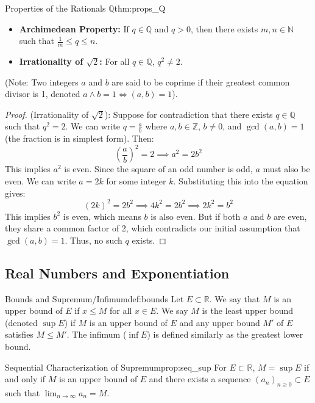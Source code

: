 \documentclass[11pt, a4paper]{article}
\begin{document}
\begin{theorem}{Properties of the Rationals $\mathbb{Q}$}{thm:props_Q}
\begin{itemize}
    \item \textbf{Archimedean Property:} If $q \in \mathbb{Q}$ and $q > 0$, then there exists $m, n \in \mathbb{N}$ such that $\frac{1}{m} \le q \le n$.
    \item \textbf{Irrationality of $\sqrt{2}$:} For all $q \in \mathbb{Q}$, $q^2 \neq 2$.
\end{itemize}
(Note: Two integers $a$ and $b$ are said to be coprime if their greatest common divisor is 1, denoted $a \wedge b = 1 \iff (a,b)=1$).
\end{theorem}
\begin{proof}
(Irrationality of $\sqrt{2}$): Suppose for contradiction that there exists $q \in \mathbb{Q}$ such that $q^2 = 2$.
We can write $q = \frac{a}{b}$ where $a, b \in \mathbb{Z}$, $b \neq 0$, and $\gcd(a,b) = 1$ (the fraction is in simplest form).
Then:
$$ \left(\frac{a}{b}\right)^2 = 2 \implies a^2 = 2b^2 $$
This implies $a^2$ is even. Since the square of an odd number is odd, $a$ must also be even. We can write $a = 2k$ for some integer $k$.
Substituting this into the equation gives:
$$ (2k)^2 = 2b^2 \implies 4k^2 = 2b^2 \implies 2k^2 = b^2 $$
This implies $b^2$ is even, which means $b$ is also even.
But if both $a$ and $b$ are even, they share a common factor of 2, which contradicts our initial assumption that $\gcd(a,b) = 1$. Thus, no such $q$ exists.
\end{proof}

\subsection{Real Numbers and Exponentiation}

\begin{definition}{Bounds and Supremum/Infimum}{def:bounds}
Let $E \subset \mathbb{R}$. We say that $M$ is an upper bound of $E$ if $x \le M$ for all $x \in E$. We say $M$ is the least upper bound (denoted $\sup E$) if $M$ is an upper bound of $E$ and any upper bound $M'$ of $E$ satisfies $M \le M'$. The infimum ($\inf E$) is defined similarly as the greatest lower bound.
\end{definition}

\begin{proposition}{Sequential Characterization of Supremum}{prop:seq_sup}
For $E \subset \mathbb{R}$, $M = \sup E$ if and only if $M$ is an upper bound of $E$ and there exists a sequence $(a_n)_{n \ge 0} \subset E$ such that $\lim_{n \to \infty} a_n = M$.
\end{proposition}
\end{document}
